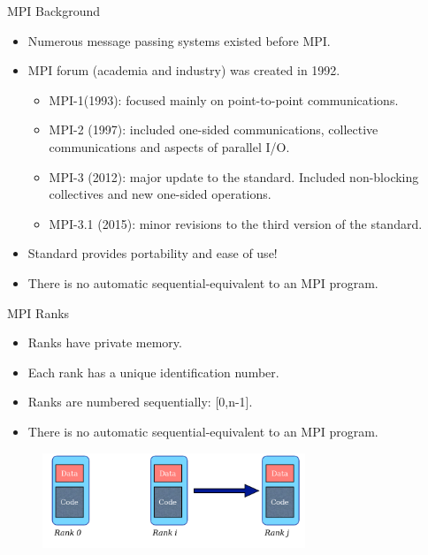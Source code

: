 \begin{frame}{MPI Background}
    \begin{itemize}
    \item Numerous message passing systems existed before MPI.
      \vspace{2mm}
    \item MPI forum (academia and industry) was created in 1992.
      \vspace{2mm}
    \begin{itemize}
    \item MPI-1(1993): focused mainly on point-to-point communications.
    \vspace{1mm}
    \item MPI-2 (1997): included one-sided communications, collective communications and aspects of parallel I/O. 
    \vspace{1mm}
    \item MPI-3 (2012): major update to the standard. Included non-blocking collectives and new one-sided operations.
    \vspace{1mm}
    \item MPI-3.1 (2015): minor revisions to the third version of the standard.  
    \end{itemize}
    \vspace{2mm}
    \item Standard provides portability and ease of use!
    \vspace{2mm}
    \item There is no automatic sequential-equivalent to an MPI program.
    
        
    \end{itemize}
\end{frame}

\begin{frame}{MPI Ranks}
    \begin{itemize}
    \item Ranks have private memory.
    \vspace{2mm}
    \item Each rank has a unique identification number.
    \vspace{2mm}
    \item Ranks are numbered sequentially: [0,n-1].
    \vspace{2mm}
    \item There is no automatic sequential-equivalent to an MPI program.
    \end{itemize}
    
    \begin{figure}
    \centering
    \includegraphics[width=0.7\textwidth]{img/mpiRanks.png}
    \end{figure} 
    
\end{frame}

